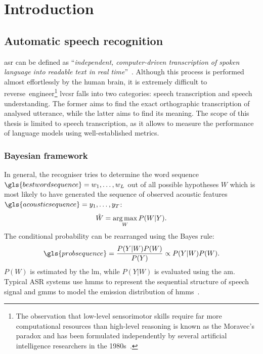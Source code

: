 \chapter{Introduction}
\label{chapter:intro}
\glsresetall

\section{Automatic speech recognition}
\label{section:asr}
\Gls{asr} can be defined as \enquote{\textit{independent, computer-driven transcription of spoken language into readable text in real time}}~\cite{stuckless1994developments, jelinek1997statistical}. Although this process is performed almost effortlessly by the human brain, it is extremely difficult to reverse~engineer\footnote{The observation that low-level sensorimotor skills require far more computational resources than high-level reasoning is known as the Moravec's paradox and has been formulated independently by several artificial intelligence researchers in the 1980s~\cite{moravec1988mind}.} \Gls{lvcsr} falls into two categories: speech transcription and speech understanding. The former aims to find the exact orthographic transcription of analysed utterance, while the latter aims to find its meaning. The scope of this thesis is limited to speech transcription, as it allows to measure the performance of language models using well-established metrics.

\subsection{Bayesian framework}
\label{subsection:bayesian}
In general, the recogniser tries to determine the word sequence $\gls{bestwordsequence}=w_{1}, \ldots, w_{L}$ out of all possible hypotheses $W$ which is most likely to have generated the sequence of observed acoustic features $\gls{acousticsequence}=y_{1}, \ldots, y_{T}$:
\begin{equation}
\label{equation:recogniser}
  \hat{W}=\operatorname*{arg\, max}_{W}P(W|Y).
\end{equation}
The conditional probability can be rearranged using the Bayes rule:
\begin{equation}
  \label{equation:bayesian}
  \gls{probsequence}=\frac{P(Y|W)P(W)}{P(Y)}\propto{P(Y|W)P(W)}.
\end{equation}
$P(W)$ is estimated by the \gls{lm}, while $P(Y|W)$ is evaluated using the \gls{am}. Typical ASR systems use \glspl{hmm} to represent the sequential structure of speech signal and \glspl{gmm} to model the emission distribution of \glspl{hmm}~\cite{baker1975dragon, bourlard1994connectionist}.

